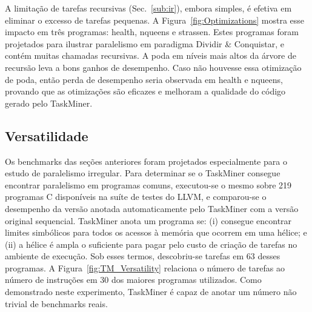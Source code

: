 \documentclass[sigconf]{acmart}
\newcommand\Taskminer{\mbox{\textsf{TaskMiner}}}
\begin{document}
A limitação de tarefas recursivas (Sec.~\ref{sub:ir}), embora simples,
é efetiva em eliminar o excesso de tarefas pequenas. 
A Figura~\ref{fig:Optimizations} mostra esse impacto em três programas: \textsf{health}, \textsf{nqueens} e
\textsf{strassen}. Estes programas foram projetados para ilustrar paralelismo
em paradigma Dividir \& Conquistar, e contém muitas chamadas
recursivas. A poda em níveis mais altos da árvore de recursão leva a bons ganhos de desempenho. 
Caso não houvesse essa otimização de poda, então perda de desempenho seria observada
em  \textsf{health} e \textsf{nqueens}, provando que as otimizações são eficazes e melhoram
a qualidade do código gerado pelo \Taskminer{}.

\subsection{Versatilidade}
\label{sub:versatility}

Os benchmarks das seções anteriores foram projetados especialmente para o estudo de 
paralelismo irregular. Para determinar se o \Taskminer{} consegue encontrar paralelismo 
em programas comuns, executou-se o mesmo sobre 219 programas C disponíveis
na suíte de testes do LLVM, e comparou-se o desempenho da versão anotada automaticamente pelo
\Taskminer{} com a versão original sequencial. 
\Taskminer{} anota um programa se:
(i) consegue encontrar limites simbólicos para todos os acessos à memória que ocorrem em uma hélice; e
(ii) a hélice é ampla o suficiente para pagar pelo custo de criação de tarefas no ambiente de execução.
Sob esses termos, descobriu-se tarefas em 63 desses programas. A Figura~\ref{fig:TM_Versatility} relaciona
o número de tarefas ao número de instruções em 30 dos maiores programas utilizados.
Como demonstrado neste experimento,
\Taskminer{} é capaz de anotar um número não trivial de benchmarks reais.
\end{document}
